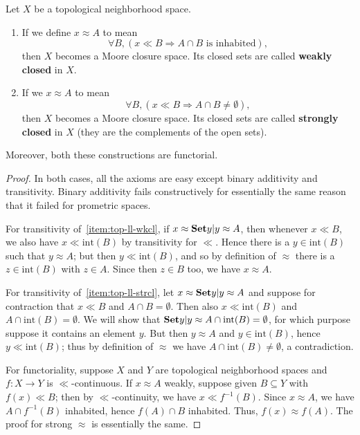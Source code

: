 \documentclass{article}
\def\int{\mathrm{int}}
\let\implies\Rightarrow
\def\inv{^{-1}}
\begin{document}
\begin{thm}\label{thm:top-closed}
  Let $X$ be a topological neighborhood space.
  \begin{enumerate}
  \item If we define $x\approx A$ to mean
    \[\forall B, (x\ll B \implies A\cap B \text{ is inhabited}),\]
    then $X$ becomes a Moore closure space.\label{item:top-ll-wkcl}
    Its closed sets are called \textbf{weakly closed} in $X$.
  \item If we $x\approx A$ to mean
    \[\forall B, (x\ll B \implies A\cap B \neq \emptyset),\]
    then $X$ becomes a Moore closure space.\label{item:top-ll-strcl}
    Its closed sets are called \textbf{strongly closed} in $X$ (they are the complements of the open sets).
  \end{enumerate}
  Moreover, both these constructions are functorial.
\end{thm}
\begin{proof}
  In both cases, all the axioms are easy except binary additivity and transitivity.
  Binary additivity fails constructively for essentially the same reason that it failed for prometric spaces.

  For transitivity of~\ref{item:top-ll-wkcl}, if $x\approx \setof{y | y\approx A}$, then whenever $x\ll B$, we also have $x\ll \int(B)$ by transitivity for $\ll$.
  Hence there is a $y\in \int(B)$ such that $y\approx A$; but then $y\ll \int(B)$, and so by definition of $\approx$ there is a $z\in\int(B)$ with $z\in A$.
  Since then $z\in B$ too, we have $x\approx A$.

  For transitivity of~\ref{item:top-ll-strcl}, let $x\approx \setof{y | y\approx A}$ and suppose for contraction that $x\ll B$ and $A\cap B =\emptyset$.
  Then also $x\ll \int(B)$ and $A\cap \int(B)=\emptyset$.
  We will show that $\setof{y | y\approx A} \cap \int(B) = \emptyset$, for which purpose suppose it contains an element $y$.
  But then $y\approx A$ and $y\in \int(B)$, hence $y\ll \int(B)$; thus by definition of $\approx$ we have $A\cap \int(B) \neq \emptyset$, a contradiction.

  For functoriality, suppose $X$ and $Y$ are topological neighborhood spaces and $f:X\to Y$ is $\ll$-continuous.
  If $x\approx A$ weakly, suppose given $B\subseteq Y$ with $f(x)\ll B$; then by $\ll$-continuity, we have $x\ll f\inv(B)$.
  Since $x\approx A$, we have $A\cap f\inv(B)$ inhabited, hence $f(A) \cap B$ inhabited.
  Thus, $f(x)\approx f(A)$.
  The proof for strong $\approx$ is essentially the same.
\end{proof}
\end{document}
